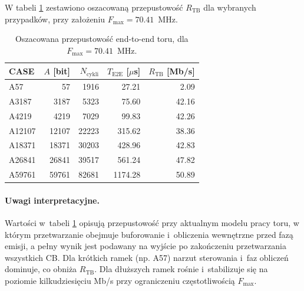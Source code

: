 W tabeli \ref{tab:pdsch_throughput_tb} zestawiono oszacowaną przepustowość $R_{\mathrm{TB}}$ dla wybranych przypadków,
przy założeniu $F_{\max}=70.41$~MHz.

\begin{table}[!ht]
\centering
\caption{Oszacowana przepustowość end-to-end toru, dla $F_{\max}=70.41$~MHz.}
\label{tab:pdsch_throughput_tb}
\begin{tabular}{lrrrr}
\hline
CASE & $A$ [bit] & $N_{\mathrm{cykli}}$ & $T_{\mathrm{E2E}}$ [$\mu$s] & $R_{\mathrm{TB}}$ [Mb/s] \\
\hline
A57     & 57    & 1916  & 27.21  & 2.09 \\
A3187   & 3187  & 5323  & 75.60  & 42.16 \\
A4219   & 4219  & 7029  & 99.83  & 42.26 \\
A12107  & 12107 & 22223 & 315.62 & 38.36 \\
A18371  & 18371 & 30203 & 428.96 & 42.83 \\
A26841  & 26841 & 39517 & 561.24 & 47.82 \\
A59761  & 59761 & 82681 & 1174.28 & 50.89 \\
\hline
\end{tabular}
\end{table}

\paragraph{Uwagi interpretacyjne.}
Wartości w~tabeli \ref{tab:pdsch_throughput_tb} opisują przepustowość przy aktualnym modelu pracy toru,
w którym przetwarzanie obejmuje buforowanie i~obliczenia wewnętrzne przed fazą emisji,
a pełny wynik jest podawany na wyjście po zakończeniu przetwarzania wszystkich CB.
Dla krótkich ramek (np. A57) narzut sterowania i~faz obliczeń dominuje, co obniża $R_{\mathrm{TB}}$.
Dla dłuższych ramek  rośnie i~stabilizuje się na poziomie kilkudziesięciu Mb/s
przy ograniczeniu częstotliwością $F_{\max}$.




